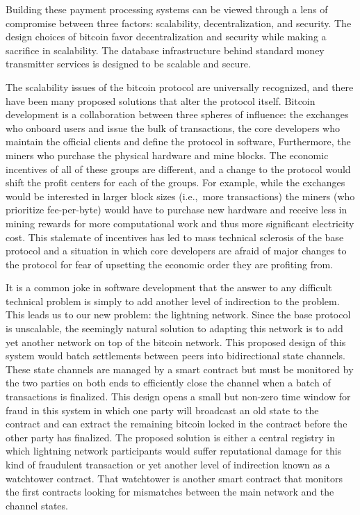 Building these payment processing systems can be viewed through a lens of
compromise between three factors: scalability, decentralization, and security.
The design choices of bitcoin favor decentralization and security while making a
sacrifice in scalability. The database infrastructure behind standard money
transmitter services is designed to be scalable and secure.


The scalability issues of the bitcoin protocol are universally recognized, and
there have been many proposed solutions that alter the protocol itself.
\cite{hinzen_proof--works_2019} Bitcoin development is a collaboration between three
spheres of influence: the exchanges who onboard users and issue the bulk of
transactions, the core developers who maintain the official clients and define
the protocol in software, Furthermore, the miners who purchase the physical
hardware and mine blocks. The economic incentives of all of these groups are
different, and a change to the protocol would shift the profit centers for each
of the groups. For example, while the exchanges would be interested in larger
block sizes (i.e., more transactions) the miners (who prioritize fee-per-byte)
would have to purchase new hardware and receive less in mining rewards for more
computational work and thus more significant electricity cost. This stalemate of
incentives has led to mass technical sclerosis of the base protocol and a
situation in which core developers are afraid of major changes to the protocol
for fear of upsetting the economic order they are profiting from.


It is a common joke in software development that the answer to any difficult
technical problem is simply to add another level of indirection to the problem.
This leads us to our new problem: the lightning network. Since the base protocol
is unscalable, the seemingly natural solution to adapting this network is to add
yet another network on top of the bitcoin network. This proposed design of this
system would batch settlements between peers into bidirectional state channels.
These state channels are managed by a smart contract but must be monitored by
the two parties on both ends to efficiently close the channel when a batch of
transactions is finalized. This design opens a small but non-zero time window
for fraud in this system in which one party will broadcast an old state to the
contract and can extract the remaining bitcoin locked in the contract before the
other party has finalized. The proposed solution is either a central registry in
which lightning network participants would suffer reputational damage for this
kind of fraudulent transaction or yet another level of indirection known as a
watchtower contract. That watchtower is another smart contract that monitors the
first contracts looking for mismatches between the main network and the channel
states.

